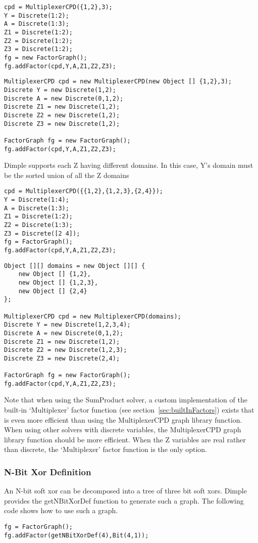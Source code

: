 \ifmatlab
\begin{lstlisting}
cpd = MultiplexerCPD({1,2},3);
Y = Discrete(1:2);
A = Discrete(1:3);
Z1 = Discrete(1:2);
Z2 = Discrete(1:2);
Z3 = Discrete(1:2);
fg = new FactorGraph();
fg.addFactor(cpd,Y,A,Z1,Z2,Z3);
\end{lstlisting}
\fi


\ifjava
\begin{lstlisting}
MultiplexerCPD cpd = new MultiplexerCPD(new Object [] {1,2},3);
Discrete Y = new Discrete(1,2);
Discrete A = new Discrete(0,1,2);
Discrete Z1 = new Discrete(1,2);
Discrete Z2 = new Discrete(1,2);
Discrete Z3 = new Discrete(1,2);

FactorGraph fg = new FactorGraph();
fg.addFactor(cpd,Y,A,Z1,Z2,Z3);
\end{lstlisting}
\fi

Dimple supports each Z having different domains.  In this case, Y's domain must be the sorted union of all the Z domains

\ifmatlab
\begin{lstlisting}
cpd = MultiplexerCPD({{1,2},{1,2,3},{2,4}});
Y = Discrete(1:4);
A = Discrete(1:3);
Z1 = Discrete(1:2);
Z2 = Discrete(1:3);
Z3 = Discrete([2 4]);
fg = FactorGraph();
fg.addFactor(cpd,Y,A,Z1,Z2,Z3);
\end{lstlisting}
\fi

\ifjava
\begin{lstlisting}
Object [][] domains = new Object [][] {
	new Object [] {1,2},
	new Object [] {1,2,3},
	new Object [] {2,4}
};

MultiplexerCPD cpd = new MultiplexerCPD(domains);
Discrete Y = new Discrete(1,2,3,4);
Discrete A = new Discrete(0,1,2);
Discrete Z1 = new Discrete(1,2);
Discrete Z2 = new Discrete(1,2,3);
Discrete Z3 = new Discrete(2,4);

FactorGraph fg = new FactorGraph();
fg.addFactor(cpd,Y,A,Z1,Z2,Z3);
\end{lstlisting}
\fi

Note that when using the SumProduct solver, a custom implementation of the built-in `Multiplexer' factor function (see section~\ref{sec:builtInFactors}) exists that is even more efficient than using the MultiplexerCPD graph library function.  When using other solvers with discrete variables, the MultiplexerCPD graph library function should be more efficient.  When the Z variables are real rather than discrete, the `Multiplexer' factor function is the only option.


\ifmatlab
\subsubsection{N-Bit Xor Definition}
An N-bit soft xor can be decomposed into a tree of three bit soft xors.  Dimple provides the getNBitXorDef function to generate such a graph.  The following code shows how to use such a graph.

\begin{lstlisting}
fg = FactorGraph();
fg.addFactor(getNBitXorDef(4),Bit(4,1));
\end{lstlisting}

\fi
